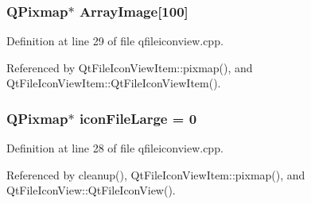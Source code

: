 \subsubsection{\setlength{\rightskip}{0pt plus 5cm}QPixmap$\ast$ {\bf Array\-Image}[100]}\label{qfileiconview_8cpp_a1}




Definition at line 29 of file qfileiconview.cpp.

Referenced by Qt\-File\-Icon\-View\-Item::pixmap(), and Qt\-File\-Icon\-View\-Item::Qt\-File\-Icon\-View\-Item().
\subsubsection{\setlength{\rightskip}{0pt plus 5cm}QPixmap$\ast$ {\bf icon\-File\-Large} = 0\hspace{0.3cm}{\tt  [static]}}\label{qfileiconview_8cpp_a0}




Definition at line 28 of file qfileiconview.cpp.

Referenced by cleanup(), Qt\-File\-Icon\-View\-Item::pixmap(), and Qt\-File\-Icon\-View::Qt\-File\-Icon\-View().